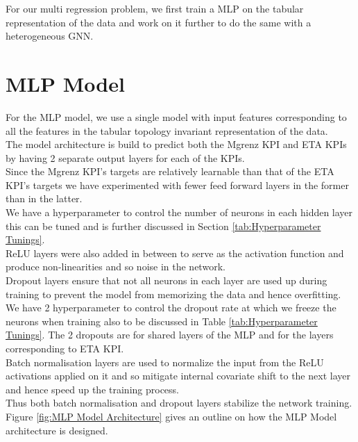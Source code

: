 \documentclass{report} %
\begin{document}
For our multi regression problem, we first train a \ac{MLP} on the tabular representation of the data and work on it further to do the same with a heterogeneous \ac{GNN}.

\section{\ac{MLP} Model}\label{sec:MLP Model}

For the \ac{MLP} model, we use a single model with input features corresponding to all the features in the tabular topology invariant representation of the data.\\
The model architecture is build to predict both the Mgrenz \ac{KPI} and ETA \ac{KPI}s by having 2 separate output layers for each of the \ac{KPI}s. \\
Since the Mgrenz \ac{KPI}'s targets are relatively learnable than that of the ETA \ac{KPI}'s targets we have experimented with fewer feed forward layers in the former than in the latter. \\
We have a hyperparameter to control the number of neurons in each hidden layer this can be tuned and is further discussed in Section \ref{tab:Hyperparameter Tunings}.\\
\ac{ReLU} layers were also added in between to serve as the activation function and produce non-linearities and so noise in the network. \\
Dropout layers ensure that not all neurons in each layer are used up during training to prevent the model from memorizing the data and hence overfitting.  
We have 2 hyperparameter to control the dropout rate at which we freeze the neurons when training also to be discussed in Table \ref{tab:Hyperparameter Tunings}.
The 2 dropouts are for shared layers of the \ac{MLP} and for the layers corresponding to ETA \ac{KPI}.\\
Batch normalisation layers are used to normalize the input from the \ac{ReLU} activations applied on it and so mitigate internal covariate shift to the next layer and hence speed up the training process.\\
Thus both batch normalisation and dropout layers stabilize the network training.\\

Figure \ref{fig:MLP Model Architecture} gives an outline on how the \ac{MLP} Model architecture is designed. \\
\end{document}
